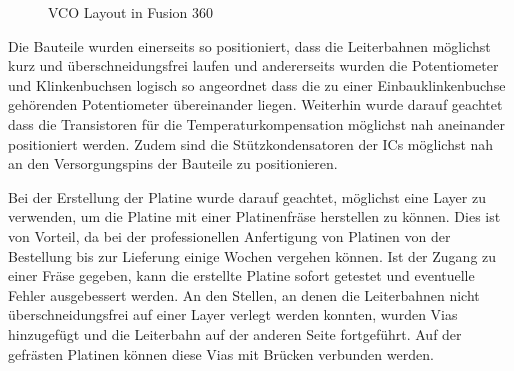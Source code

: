 \begin{figure}[h]
	\centering
	\setlength{\fboxsep}{1pt} %
	\setlength{\fboxrule}{1pt} %
	\caption{VCO Layout in Fusion 360}
	\label{fig:VCO Layout}
\end{figure}

Die Bauteile wurden einerseits so positioniert, dass die Leiterbahnen möglichst kurz und überschneidungsfrei laufen und andererseits wurden die Potentiometer und Klinkenbuchsen logisch so angeordnet dass die zu einer Einbauklinkenbuchse gehörenden Potentiometer übereinander liegen.
Weiterhin wurde darauf geachtet dass die Transistoren für die Temperaturkompensation möglichst nah aneinander positioniert werden.
Zudem sind die Stützkondensatoren der ICs möglichst nah an den Versorgungspins der Bauteile zu positionieren.

Bei der Erstellung der Platine wurde darauf geachtet, möglichst eine Layer zu verwenden, um die Platine mit einer Platinenfräse herstellen zu können.
Dies ist von Vorteil, da bei der professionellen Anfertigung von Platinen von der Bestellung bis zur Lieferung einige Wochen vergehen können.
Ist der Zugang zu einer Fräse gegeben, kann die erstellte Platine sofort getestet und eventuelle Fehler ausgebessert werden.
An den Stellen, an denen die Leiterbahnen nicht überschneidungsfrei auf einer Layer verlegt werden konnten, wurden Vias hinzugefügt und die Leiterbahn auf der anderen Seite fortgeführt.
Auf der gefrästen Platinen können diese Vias mit Brücken verbunden werden.

